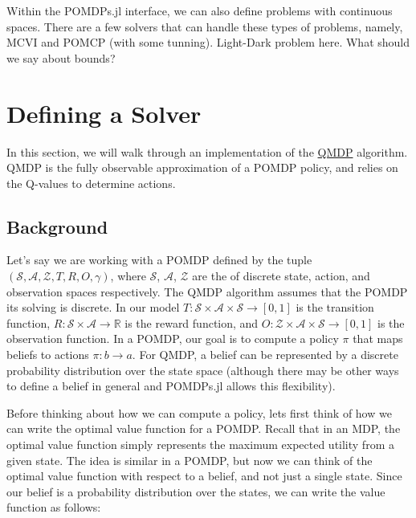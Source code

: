 \documentclass[12pt,]{article}
\begin{document}
Within the POMDPs.jl interface, we can also define problems with
continuous spaces. There are a few solvers that can handle these types
of problems, namely, MCVI and POMCP (with some tunning). Light-Dark
problem here. What should we say about bounds?

\section{Defining a Solver}\label{defining-a-solver}

In this section, we will walk through an implementation of the
\href{http://www-anw.cs.umass.edu/~barto/courses/cs687/Cassandra-etal-POMDP.pdf}{QMDP}
algorithm. QMDP is the fully observable approximation of a POMDP policy,
and relies on the Q-values to determine actions.

\subsection{Background}\label{background}

Let's say we are working with a POMDP defined by the tuple
\((\mathcal{S}, \mathcal{A}, \mathcal{Z}, T, R, O, \gamma)\), where
\(\mathcal{S}\), \(\mathcal{A}\), \(\mathcal{Z}\) are the of discrete
state, action, and observation spaces respectively. The QMDP algorithm
assumes that the POMDP its solving is discrete. In our model
\(T : \mathcal{S} \times \mathcal{A} \times \mathcal{S} \rightarrow [0, 1]\)
is the transition function,
\(R: \mathcal{S} \times \mathcal{A} \rightarrow \mathbb{R}\) is the
reward function, and
\(O: \mathcal{Z} \times \mathcal{A} \times \mathcal{S} \rightarrow [0,1]\)
is the observation function. In a POMDP, our goal is to compute a policy
\(\pi\) that maps beliefs to actions \(\pi: b \rightarrow a\). For QMDP,
a belief can be represented by a discrete probability distribution over
the state space (although there may be other ways to define a belief in
general and POMDPs.jl allows this flexibility).

Before thinking about how we can compute a policy, lets first think of
how we can write the optimal value function for a POMDP. Recall that in
an MDP, the optimal value function simply represents the maximum
expected utility from a given state. The idea is similar in a POMDP, but
now we can think of the optimal value function with respect to a belief,
and not just a single state. Since our belief is a probability
distribution over the states, we can write the value function as
follows:
\end{document}
